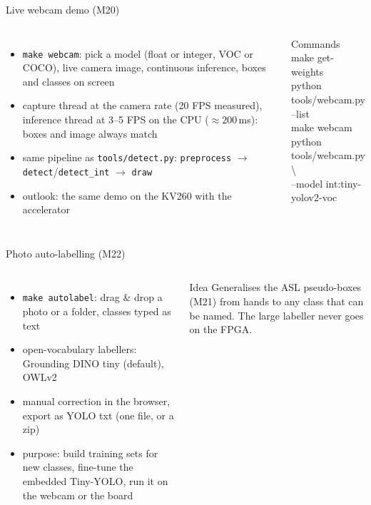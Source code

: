 \documentclass[aspectratio=169,11pt]{beamer}
\begin{document}
\begin{frame}{Live webcam demo (M20)}
  \small
  \begin{columns}[c]
    \begin{itemize}
      \item \texttt{make webcam}: pick a model (float or integer, VOC or COCO), live camera
        image, continuous inference, boxes and classes on screen
      \item capture thread at the camera rate (20 FPS measured), inference thread at
        3--5 FPS on the CPU ($\approx 200$\,ms): boxes and image always match
      \item same pipeline as \texttt{tools/detect.py}: \texttt{preprocess} $\to$
        \texttt{detect}/\texttt{detect\_int} $\to$ \texttt{draw}
      \item outlook: the same demo on the KV260 with the accelerator
    \end{itemize}
    \begin{block}{Commands}
      \scriptsize\ttfamily
      make get-weights\\
      python tools/webcam.py --list\\
      make webcam\\
      python tools/webcam.py \textbackslash\\
      \quad --model int:tiny-yolov2-voc
    \end{block}
  \end{columns}
\end{frame}

\begin{frame}{Photo auto-labelling (M22)}
  \small
  \begin{columns}[c]
    \begin{itemize}
      \item \texttt{make autolabel}: drag \& drop a photo or a folder, classes typed as
        text
      \item open-vocabulary labellers: Grounding DINO tiny (default), OWLv2
      \item manual correction in the browser, export as YOLO txt (one file, or a zip)
      \item purpose: build training sets for new classes, fine-tune the embedded
        Tiny-YOLO, run it on the webcam or the board
    \end{itemize}
    \begin{block}{Idea}
      Generalises the ASL pseudo-boxes (M21) from hands to any class that can be named.
      The large labeller never goes on the FPGA.
    \end{block}
  \end{columns}
\end{frame}
\end{document}
